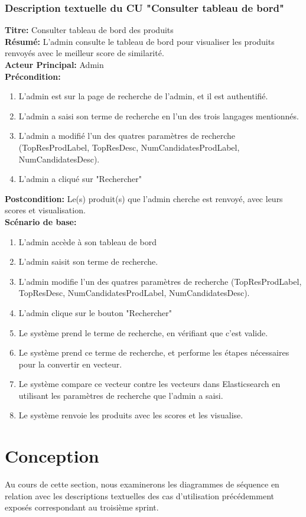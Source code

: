 \subsubsection{Description textuelle du CU "Consulter tableau de bord"}
\noindent
\textbf{Titre:} Consulter tableau de bord des produits \\
\textbf{Résumé:} L'admin consulte le tableau de bord pour visualiser les produits renvoyés avec le meilleur score de similarité. \\
\textbf{Acteur Principal:} Admin \\
\textbf{Précondition:} \begin{enumerate}
	\item L'admin est sur la page de recherche de l'admin, et il est authentifié.
	\item L'admin a saisi son terme de recherche en l'un des trois langages mentionnés.
	\item L'admin a modifié l'un des quatres paramètres de recherche (TopResProdLabel, TopResDesc, NumCandidatesProdLabel, NumCandidatesDesc).
	\item L'admin a cliqué sur "Rechercher"
\end{enumerate}
\textbf{Postcondition:} Le(s) produit(s) que l'admin cherche est renvoyé, avec leurs scores et visualisation. \\
\textbf{Scénario de base: }
\begin{enumerate}
	\item L'admin accède à son tableau de bord
	\item L'admin saisit son terme de recherche.
	\item L'admin modifie l'un des quatres paramètres de recherche (TopResProdLabel, TopResDesc, NumCandidatesProdLabel, NumCandidatesDesc).
	\item L'admin clique sur le bouton "Rechercher"
	\item Le système prend le terme de recherche, en vérifiant que c'est valide.
	\item Le système prend ce terme de recherche, et performe les étapes nécessaires pour la convertir en vecteur.
	\item Le système compare ce vecteur contre les vecteurs dans Elasticsearch en utilisant les paramètres de recherche que l'admin a saisi.
	\item Le système renvoie les produits avec les scores et les visualise.
\end{enumerate}

\newpage
\section{Conception}
\noindent
Au cours de cette section, nous examinerons les diagrammes de séquence en relation avec les descriptions textuelles des cas d'utilisation précédemment exposés correspondant au troisième sprint.

